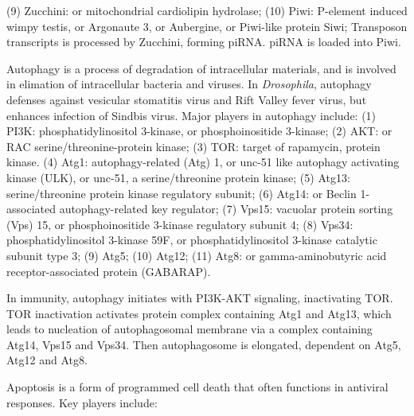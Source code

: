\documentclass[11pt]{article}
\begin{document}
\begin{sloppypar}
\newline
(9) Zucchini: or mitochondrial cardiolipin hydrolase; \newline
(10) Piwi: P-element induced wimpy testis, or Argonaute 3, or Aubergine, or Piwi-like protein Siwi; \newline
Transposon transcripts is processed by Zucchini, forming piRNA. 
piRNA is loaded into Piwi. 
\par
Autophagy is a process of degradation of intracellular materials, and is involved in elimation of intracellular bacteria and viruses. 
In \textit{Drosophila}, autophagy defenses against vesicular stomatitis virus and Rift Valley fever virus, but enhances infection of Sindbis virus. 
Major players in autophagy include: 
\newline
(1) PI3K: phosphatidylinositol 3-kinase, or phosphoinositide 3-kinase; \newline
(2) AKT: or RAC serine/threonine-protein kinase; \newline
(3) TOR: target of rapamycin, protein kinase. \newline
(4) Atg1: autophagy-related (Atg) 1, or unc-51 like autophagy activating kinase (ULK), or unc-51, a serine/threonine protein kinase; \newline
(5) Atg13: serine/threonine protein kinase regulatory subunit; \newline
(6) Atg14: or Beclin 1-associated autophagy-related key regulator; \newline
(7) Vps15: vacuolar protein sorting (Vps) 15, or phosphoinositide 3-kinase regulatory subunit 4; \newline
(8) Vps34: phosphatidylinositol 3-kinase 59F, or phosphatidylinositol 3-kinase catalytic subunit type 3; \newline
(9) Atg5; \newline
(10) Atg12; \newline
(11) Atg8: or gamma-aminobutyric acid receptor-associated protein (GABARAP). 
\par
In immunity, autophagy initiates with PI3K-AKT signaling, inactivating TOR. 
TOR inactivation activates protein complex containing Atg1 and Atg13, which leads to nucleation of autophagosomal membrane via a complex containing Atg14, Vps15 and Vps34. 
Then autophagosome is elongated, dependent on Atg5, Atg12 and Atg8.
\par
Apoptosis is a form of programmed cell death that often functions in antiviral responses. 
Key players include: 
\newline

\end{sloppypar}
\end{document}
